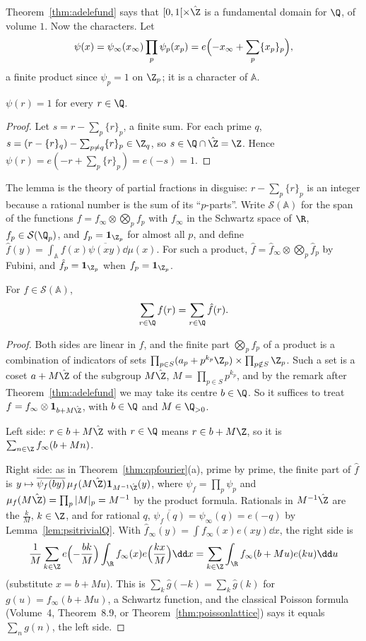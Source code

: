 Theorem~\ref{thm:adelefund} says that $[0,1[\times\hat{\Z}$ is a fundamental domain for $\Q$, of volume $1$. Now the characters. Let
\[\psi(x)=\psi_\infty(x_\infty)\prod_p\psi_p(x_p)=e\Bigl(-x_\infty+\sum_p\{x_p\}_p\Bigr),\]
a finite product since $\psi_p=1$ on $\Z_p$; it is a character of $\mathbb A$.

\begin{lemma}\label{lem:psitrivialQ}
$\psi(r)=1$ for every $r\in\Q$.
\end{lemma}
\begin{proof}
Let $s=r-\sum_p\{r\}_p$, a finite sum. For each prime $q$, $s=(r-\{r\}_q)-\sum_{p\ne q}\{r\}_p\in\Z_q$, so $s\in\Q\cap\hat{\Z}=\Z$. Hence $\psi(r)=e(-r+\sum_p\{r\}_p)=e(-s)=1$.
\end{proof}

The lemma is the theory of partial fractions in disguise: $r-\sum_p\{r\}_p$ is an integer because a rational number is the sum of its ``$p$-parts''. Write $\mathcal S(\mathbb A)$
for the span of the functions $f=f_\infty\otimes\bigotimes_pf_p$ with $f_\infty$ in the Schwartz space of $\R$, $f_p\in\mathcal S(\Q_p)$, and $f_p=\mathbf 1_{\Z_p}$ for almost all
$p$, and define $\hat f(y)=\int_{\mathbb A}f(x)\overline{\psi(xy)}\dd\mu(x)$. For such a product, $\hat f=\hat f_\infty\otimes\bigotimes_p\hat f_p$ by Fubini, and $\hat f_p=\mathbf 1_{\Z_p}$ when
$f_p=\mathbf 1_{\Z_p}$.

\begin{theorem}\label{thm:adelepoisson}
For $f\in\mathcal S(\mathbb A)$,
\[\sum_{r\in\Q}f(r)=\sum_{r\in\Q}\hat f(r).\]
\end{theorem}
\begin{proof}
Both sides are linear in $f$, and the finite part $\bigotimes_pf_p$ of a product is a combination of indicators of sets $\prod_{p\in S}(a_p+p^{k_p}\Z_p)\times\prod_{p\notin S}\Z_p$.
Such a set is a coset $a+M\hat{\Z}$ of the subgroup $M\hat{\Z}$, $M=\prod_{p\in S}p^{k_p}$, and by the remark after Theorem~\ref{thm:adelefund} we may take its centre $b\in\Q$. So it
suffices to treat $f=f_\infty\otimes\mathbf 1_{b+M\hat{\Z}}$, with $b\in\Q$ and $M\in\Q_{>0}$.

Left side: $r\in b+M\hat{\Z}$ with $r\in\Q$ means $r\in b+M\Z$, so it is $\sum_{n\in\Z}f_\infty(b+Mn)$.

Right side: as in Theorem~\ref{thm:qpfourier}(a), prime by prime, the finite part of $\hat f$ is $y\mapsto\overline{\psi_f(by)}\,\mu_f(M\hat{\Z})\mathbf 1_{M^{-1}\hat{\Z}}(y)$, where $\psi_f=\prod_p\psi_p$ and
$\mu_f(M\hat{\Z})=\prod_p|M|_p=M^{-1}$ by the product formula. Rationals in $M^{-1}\hat{\Z}$ are the $\frac kM$, $k\in\Z$, and for rational $q$, $\overline{\psi_f(q)}=\psi_\infty(q)=e(-q)$ by
Lemma~\ref{lem:psitrivialQ}. With $\hat f_\infty(y)=\int f_\infty(x)e(xy)\dd x$, the right side is
\[\frac1M\sum_{k\in\Z}e\Bigl(-\frac{bk}M\Bigr)\int_\R f_\infty(x)e\Bigl(\frac{kx}M\Bigr)\dd x=\sum_{k\in\Z}\int_\R f_\infty(b+Mu)e(ku)\dd u\]
(substitute $x=b+Mu$). This is $\sum_k\hat g(-k)=\sum_k\hat g(k)$ for $g(u)=f_\infty(b+Mu)$, a Schwartz function, and the classical Poisson formula (Volume~4, Theorem~8.9, or
Theorem~\ref{thm:poissonlattice}) says it equals $\sum_ng(n)$, the left side.
\end{proof}

